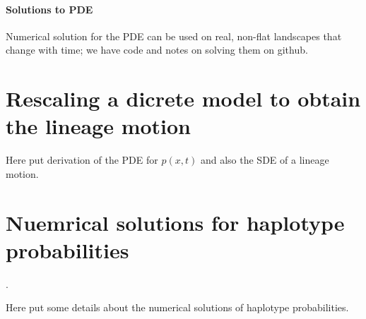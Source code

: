 \documentclass[12pt]{article}
\begin{document}
\paragraph{Solutions to PDE}
Numerical solution for the PDE can be used on real, non-flat landscapes that change with time;
we have code and notes on solving them on github.




\appendix

\section{Rescaling a dicrete model to obtain the lineage motion}
\label{apx:lineage_derivation}

Here put derivation of the PDE for $p(x,t)$ and also the SDE of a lineage motion.

\section{Nuemrical solutions for haplotype probabilities}
\label{apx:haplotype_calcs}.

Here put some details about the numerical solutions of haplotype probabilities.
\end{document}
